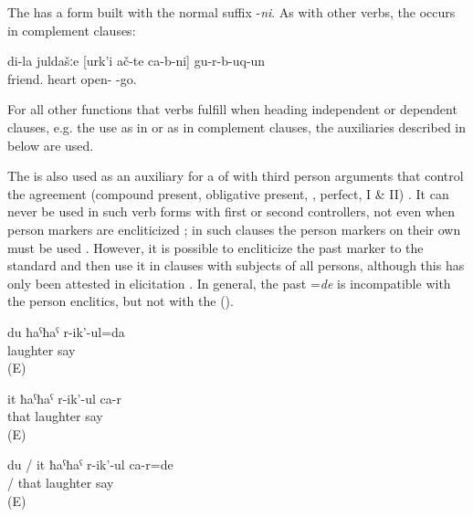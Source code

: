 The  has a  form built with the normal  suffix -\textit{ni}. As with other verbs, the  occurs in complement clauses:

\begin{exe}
	\ex	\label{ex:My friends turned out to be open-hearted.}
	\gll	di-la		juldašːe		[urk'i	ač-te		ca-b-ni]			gu-r-b-uq-un\\
			friend.	heart	open- 		-go.\\
	\glt	{}
\end{exe}



For all other functions that verbs fulfill when heading independent or dependent clauses, e.g. the use as  in  or as  in complement clauses, the auxiliaries described in  below are used. 

The  is also used as an auxiliary for a  of  with third person arguments that control the agreement (compound present, obligative present, , perfect,  I \& II) . It can never be used in such verb forms with first or second  controllers, not even when person markers are encliticized ; in such clauses the person markers on their own must be used . However, it is possible to encliticize the past marker  to the standard  and then use it in clauses with subjects of all persons, although this has only been attested in elicitation . In general, the past  =\textit{de} is incompatible with the person enclitics, but not with the  ().
%
\begin{exe}

	\ex	\label{ex:I am laughing}
	\gll	du	ħaˁħaˁ	r-ik'-ul=da\\
			laughter say\\
	\glt	{} (E)

	\ex	\label{ex:She is laughing}
	\gll	it	ħaˁħaˁ	r-ik'-ul	ca-r\\
		that	laughter say	\\
	\glt	{} (E)

	\ex	\label{ex:I was / She was laughing}
	\gll	du	/	it	ħaˁħaˁ	r-ik'-ul	ca-r=de\\
			/	that	laughter say	\\
	\glt	{} (E)
\end{exe}

